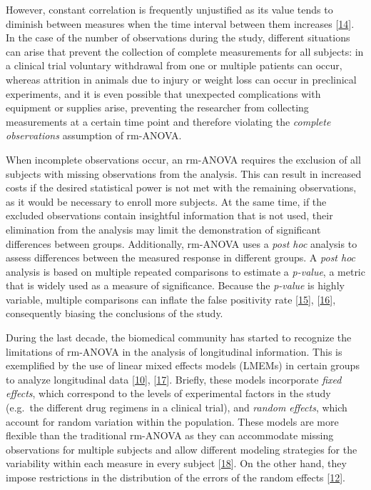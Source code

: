 \documentclass[
]{article}
\begin{document}
However, constant correlation is frequently unjustified as its value
tends to diminish between measures when the time interval between them
increases {[}\protect\hyperlink{ref-ugrinowitsch2004}{14}{]}. In the
case of the number of observations during the study, different
situations can arise that prevent the collection of complete
measurements for all subjects: in a clinical trial voluntary withdrawal
from one or multiple patients can occur, whereas attrition in animals
due to injury or weight loss can occur in preclinical experiments, and
it is even possible that unexpected complications with equipment or
supplies arise, preventing the researcher from collecting measurements
at a certain time point and therefore violating the \emph{complete
observations} assumption of rm-ANOVA.

When incomplete observations occur, an rm-ANOVA requires the exclusion
of all subjects with missing observations from the analysis. This can
result in increased costs if the desired statistical power is not met
with the remaining observations, as it would be necessary to enroll more
subjects. At the same time, if the excluded observations contain
insightful information that is not used, their elimination from the
analysis may limit the demonstration of significant differences between
groups. Additionally, rm-ANOVA uses a \emph{post hoc} analysis to assess
differences between the measured response in different groups. A
\emph{post hoc} analysis is based on multiple repeated comparisons to
estimate a \emph{p-value}, a metric that is widely used as a measure of
significance. Because the \emph{p-value} is highly variable, multiple
comparisons can inflate the false positivity rate
{[}\protect\hyperlink{ref-liu2010}{15}{]},
{[}\protect\hyperlink{ref-halsey2015}{16}{]}, consequently biasing the
conclusions of the study.

During the last decade, the biomedical community has started to
recognize the limitations of rm-ANOVA in the analysis of longitudinal
information. This is exemplified by the use of linear mixed effects
models (LMEMs) in certain groups to analyze longitudinal data
{[}\protect\hyperlink{ref-skala2010}{10}{]},
{[}\protect\hyperlink{ref-vishwanath2009}{17}{]}. Briefly, these models
incorporate \emph{fixed effects}, which correspond to the levels of
experimental factors in the study (e.g.~the different drug regimens in a
clinical trial), and \emph{random effects}, which account for random
variation within the population. These models are more flexible than the
traditional rm-ANOVA as they can accommodate missing observations for
multiple subjects and allow different modeling strategies for the
variability within each measure in every subject
{[}\protect\hyperlink{ref-pinheiro2006}{18}{]}. On the other hand, they
impose restrictions in the distribution of the errors of the random
effects {[}\protect\hyperlink{ref-gueorguieva2004}{12}{]}.
\end{document}
